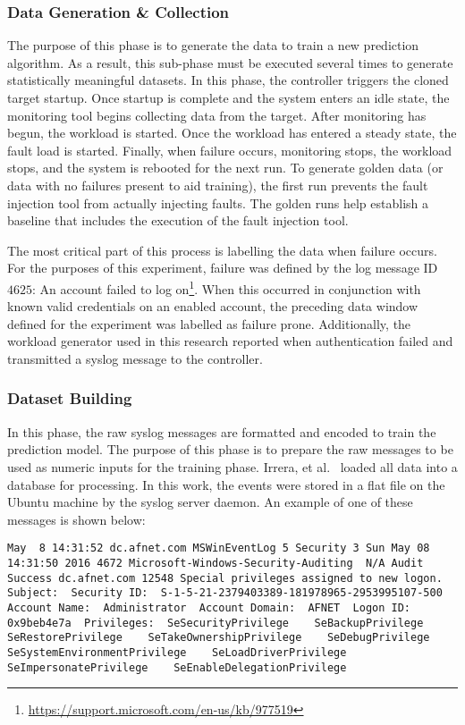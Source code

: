 \subsubsection{Data Generation \& Collection}
The purpose of this phase is to generate the data to train a new prediction
algorithm.  As a result, this sub-phase must be executed several times to
generate statistically meaningful datasets.  In this phase, the controller
triggers the cloned target startup.  Once startup is complete and the system
enters an idle state, the monitoring tool begins collecting data from the
target.  After monitoring has begun, the workload is started.  Once the
workload has entered a steady state, the fault load is started.  Finally, when
failure occurs, monitoring stops, the workload stops, and the system is
rebooted for the next run.  To generate golden data (or data with no failures
present to aid training), the first run prevents the fault injection tool from
actually injecting faults.  The golden runs help establish a baseline that
includes the execution of the fault injection tool.

The most critical part of this process is labelling the data when failure
occurs.  For the purposes of this experiment, failure was defined by the log
message ID $4625$: An account failed to log
on\footnote{\url{https://support.microsoft.com/en-us/kb/977519}}.  When this
occurred in conjunction with known valid credentials on an enabled account, the
preceding data window defined for the experiment was labelled as failure prone.
Additionally, the workload generator used in this research reported when
authentication failed and transmitted a syslog message to the controller.  

\subsubsection{Dataset Building} \label{sec:dataset.building}
In this phase, the raw syslog messages are formatted and encoded to train the
prediction model.  The purpose of this phase is to prepare the raw messages to
be used as numeric inputs for the training phase.  Irrera, et
al.~\cite{irrera2015} loaded all data into a database for processing.  In this
work, the events were stored in a flat file on the Ubuntu machine by
the syslog server daemon.  An example of one of these messages is shown below:

\begin{lstlisting}
May  8 14:31:52 dc.afnet.com MSWinEventLog 5 Security 3 Sun May 08 14:31:50 2016 4672 Microsoft-Windows-Security-Auditing  N/A Audit Success dc.afnet.com 12548 Special privileges assigned to new logon.  Subject:  Security ID:  S-1-5-21-2379403389-181978965-2953995107-500  Account Name:  Administrator  Account Domain:  AFNET  Logon ID:  0x9beb4e7a  Privileges:  SeSecurityPrivilege    SeBackupPrivilege    SeRestorePrivilege    SeTakeOwnershipPrivilege    SeDebugPrivilege    SeSystemEnvironmentPrivilege    SeLoadDriverPrivilege    SeImpersonatePrivilege    SeEnableDelegationPrivilege
\end{lstlisting}

